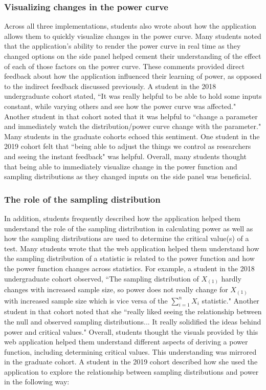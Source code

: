 \documentclass{TISE}
\begin{document}
\subsubsection{Visualizing changes in the power curve}

Across all three implementations, students also wrote about how the application allows them to quickly visualize changes in the power curve. Many students noted that the application's ability to render the power curve in real time as they changed options on the side panel helped cement their understanding of the effect of each of those factors on the power curve. These comments provided direct feedback about how the application influenced their learning of power, as opposed to the indirect feedback discussed previously. A student in the 2018 undergraduate cohort stated, ``It was really helpful to be able to hold some inputs constant, while varying others and see how the power curve was affected." Another student in that cohort noted that it was helpful to ``change a parameter and immediately watch the distribution/power curve change with the parameter." Many students in the graduate cohorts echoed this sentiment. One student in the 2019 cohort felt that ``being able to adjust the things we control as researchers and seeing the instant feedback" was helpful. Overall, many students thought that being able to immediately visualize change in the power function and sampling distributions as they changed inputs on the side panel was beneficial. 

\subsubsection{The role of the sampling distribution}

In addition, students frequently described how the application helped them understand the role of the sampling distribution in calculating power as well as how the sampling distributions are used to determine the critical value(s) of a test. Many students wrote that the web application helped them understand how the sampling distribution of a statistic is related to the power function and how the power function changes across statistics. For example, a student in the 2018 undergraduate cohort observed, ``The sampling distribution of $X_{(1)}$ hardly changes with increased sample size, so power does not really change for $X_{(1)}$ with increased sample size which is vice versa of the $\sum_{i=1}^n X_i$ statistic." Another student in that cohort noted that she ``really liked seeing the relationship between the null and observed sampling distributions... It really solidified the ideas behind power and critical values." Overall, students thought the visuals provided by this web application helped them understand different aspects of deriving a power function, including determining critical values. This understanding was mirrored in the graduate cohort. A student in the 2019 cohort described how she used the application to explore the relationship between sampling distributions and power in the following way:
\end{document}
